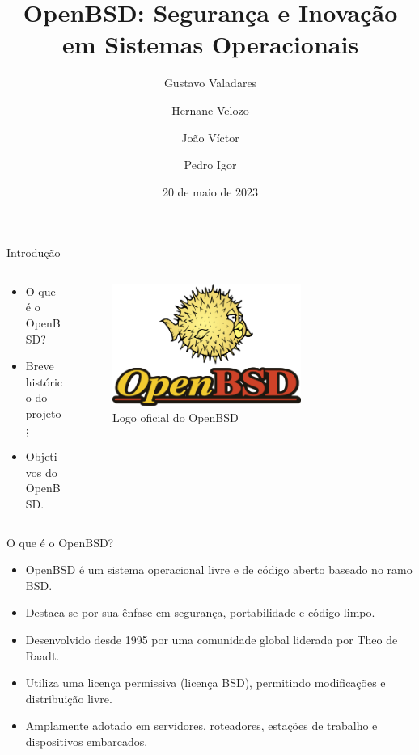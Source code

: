 \documentclass[9pt,xcolor=table]{beamer}
\date{20 de maio de 2023}
\title{OpenBSD: Segurança e Inovação em Sistemas Operacionais}
\institute[PUC]{Pontifícia Universidade Católica de Minas Gerais}
\author[Gustavo Valadares, Hernane Velozo, João Víctor, Pedro Igor]{Gustavo Valadares \and Hernane Velozo \and João Víctor \and Pedro Igor}
\begin{document}
\begin{frame}
  \titlepage
\end{frame}
\begin{frame}{Introdução}
  \begin{columns}
    \begin{column}{0.4\textwidth}
      \begin{itemize}
        \item O que é o OpenBSD?
        \item Breve histórico do projeto;
        \item Objetivos do OpenBSD.
      \end{itemize}
    \end{column}
    \begin{column}{0.7\textwidth}
      \begin{figure}
        \centering
        \includegraphics[width=0.7\textwidth]{imagens/openbsd-logo.png}
        \caption{Logo oficial do OpenBSD}
      \end{figure}
    \end{column}
  \end{columns}
\end{frame}
\begin{frame}{O que é o OpenBSD?}
  \begin{itemize}
    \item OpenBSD é um sistema operacional livre e de código aberto baseado no ramo BSD.
    \item Destaca-se por sua ênfase em segurança, portabilidade e código limpo.
    \item Desenvolvido desde 1995 por uma comunidade global liderada por Theo de Raadt.
    \item Utiliza uma licença permissiva (licença BSD), permitindo modificações e distribuição livre.
    \item Amplamente adotado em servidores, roteadores, estações de trabalho e dispositivos embarcados.
  \end{itemize}
\end{frame}
\end{document}
